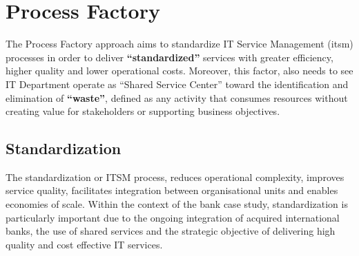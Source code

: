\chapter{Process Factory}



The Process Factory approach aims to standardize IT Service Management (\gls{itsm}) processes in order to deliver \textbf{``standardized''} services with greater efficiency, higher quality and lower operational costs. Moreover, this factor, also needs to see IT Department operate as ``Shared Service Center'' toward the identification and elimination of \textbf{``waste''}, defined as any activity that consumes resources without creating value for stakeholders or supporting business objectives. 



\section{Standardization}
\label{subs:standardization}


The standardization or ITSM process, reduces operational complexity, improves service quality, facilitates integration between organisational units and enables economies of scale. Within the context of the bank case study, standardization is particularly important due to the ongoing integration of acquired international banks, the use of shared services and the strategic objective of delivering high quality and cost effective IT services. \\



